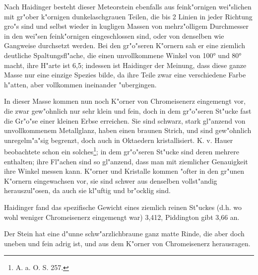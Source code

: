 \documentclass[a4paper, 11pt, oneside]{article}
\begin{document}
Nach Haidinger besteht dieser Meteorstein ebenfalls aus feink"ornigen wei"slichen mit gr"ober k"ornigen dunkelaschgrauen Teilen, die bis 2 Linien in jeder Richtung gro"s sind und selbst wieder in kugligen Massen von mehrz"olligem Durchmesser in den wei"sen feink"ornigen eingeschlossen sind, oder von denselben wie Gangweise durchsetzt werden. Bei den gr"o"seren K"ornern sah er eine ziemlich deutliche Spaltungsfl"ache, die einen unvollkommene Winkel von 100° und 80° macht, ihre H"arte ist 6,5; indessen ist Haidinger der Meinung, dass diese ganze Masse nur eine einzige Spezies bilde, da ihre Teile zwar eine verschiedene Farbe h"atten, aber vollkommen ineinander "ubergingen.

In dieser Masse kommen nun noch K"orner von Chromeisenerz eingemengt vor, die zwar gew"ohnlich nur sehr klein und fein, doch in dem gr"o"seren St"ucke fast die Gr"o"se einer kleinen Erbse erreichen. Sie sind schwarz, stark gl"anzend von unvollkommenem Metallglanz, haben einen braunen Strich, und sind gew"ohnlich unregelm"a"sig begrenzt, doch auch in Oktaedern kristallisiert. K. v. Hauer beobachtete schon ein solches\footnote{A. a. O. S. 257.}; in dem gr"o"seren St"ucke sind deren mehrere enthalten; ihre Fl"achen sind so gl"anzend, dass man mit ziemlicher Genauigkeit ihre Winkel messen kann. K"orner und Kristalle kommen "ofter in den gr"unen K"ornern eingewachsen vor, sie sind schwer aus denselben vollst"andig herauszul"osen, da auch sie kl"uftig und br"ocklig sind.

Haidinger fand das spezifische Gewicht eines ziemlich reinen St"uckes (d.h. wo wohl weniger Chromeisenerz eingemengt war) 3,412, Piddington gibt 3,66 an.

Der Stein hat eine d"unne schw"arzlichbraune ganz matte Rinde, die aber doch uneben und fein adrig ist, und aus dem K"orner von Chromeisenerz herausragen.
\end{document}

